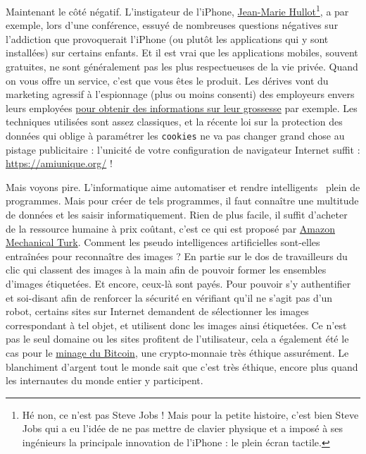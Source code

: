 \documentclass[10pt]{article}
\begin{document}
Maintenant le côté négatif. L'instigateur de l'iPhone, \href{https://fr.wikipedia.org/wiki/Jean-Marie_Hullot}{Jean-Marie Hullot}\footnote{
  Hé non, ce n'est pas Steve Jobs ! Mais pour la petite histoire, c'est bien Steve Jobs qui a eu l'idée de ne pas mettre de clavier physique
  et a imposé à ses ingénieurs la principale innovation de l'iPhone : le plein écran tactile.
}, a par exemple, lors d'une conférence, essuyé de nombreuses questions négatives sur l'addiction que provoquerait l'iPhone
(ou plutôt les applications qui y sont installées) sur certains enfants. Et il est vrai que les applications mobiles, souvent gratuites,
ne sont généralement pas les plus respectueuses de la vie privée. Quand on vous offre un service, c'est que vous êtes le produit.
Les dérives vont du marketing agressif à l'espionnage (plus ou moins consenti) des employeurs envers leurs employées
\href{https://www.lemonde.fr/pixels/article/2019/04/12/aux-etats-unis-des-employeurs-font-main-basse-sur-les-donnees-des-applications-de-grossesse_5449283_4408996.html}{pour obtenir des informations sur leur grossesse} par exemple.
Les techniques utilisées sont assez classiques, et la récente loi sur la protection des données qui oblige à paramétrer les \texttt{cookies}
ne va pas changer grand chose au pistage publicitaire : l'unicité de votre configuration de navigateur Internet suffit :
\url{https://amiunique.org/} !


Mais voyons pire. L'informatique aime automatiser et rendre \og intelligents \fg~plein de programmes. Mais pour créer de tels programmes,
il faut connaître une multitude de données et les saisir informatiquement. Rien de plus facile, il suffit
d'acheter de la ressource humaine à prix coûtant, c'est ce qui est proposé par \href{https://www.mturk.com/}{Amazon Mechanical Turk}.
Comment les pseudo \og intelligences artificielles \fg sont-elles entraînées pour reconnaître des images ?
En partie sur le dos de travailleurs du clic qui classent des images à la main afin de pouvoir former les ensembles d'images étiquetées.
Et encore, ceux-là sont payés. Pour pouvoir s'y authentifier et soi-disant afin de renforcer la sécurité en vérifiant qu'il ne s'agit pas d'un robot,
certains sites sur Internet demandent de sélectionner les images correspondant à tel objet, et utilisent donc les images ainsi étiquetées.
Ce n'est pas le seul domaine ou les sites profitent de l'utilisateur, cela a également été le cas pour le
\href{https://www.lemonde.fr/pixels/article/2018/01/31/ces-logiciels-qui-utilisent-votre-ordinateur-pour-fabriquer-des-cryptomonnaies_5249816_4408996.html}{minage du Bitcoin},
une crypto-monnaie très éthique assurément. Le blanchiment d'argent tout le monde sait que c'est très éthique, encore plus quand les internautes du monde entier y participent.
\end{document}
